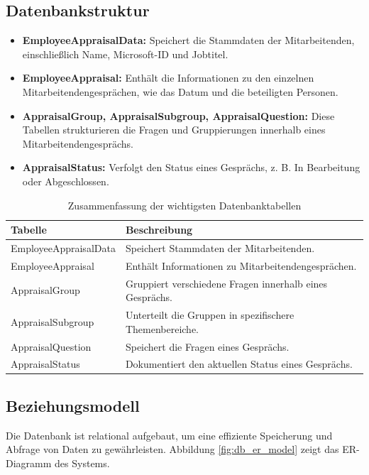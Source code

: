 \subsection{Datenbankstruktur}
\begin{itemize}
    \item \textbf{EmployeeAppraisalData:} Speichert die Stammdaten der Mitarbeitenden, einschlie\ss lich Name, Microsoft-ID und Jobtitel.
    \item \textbf{EmployeeAppraisal:} Enth\"alt die Informationen zu den einzelnen Mitarbeitendengespr\"achen, wie das Datum und die beteiligten Personen.
    \item \textbf{AppraisalGroup, AppraisalSubgroup, AppraisalQuestion:} Diese Tabellen strukturieren die Fragen und Gruppierungen innerhalb eines Mitarbeitendengespr\"achs.
    \item \textbf{AppraisalStatus:} Verfolgt den Status eines Gespr\"achs, z. B. \glqq In Bearbeitung\grqq{} oder \glqq Abgeschlossen\grqq{}.
\end{itemize}

\begin{table}[h!]
\centering
\caption{Zusammenfassung der wichtigsten Datenbanktabellen}
\label{tab:db_overview}
\begin{tabularx}{\textwidth}{|X|X|}
\hline
\textbf{Tabelle} & \textbf{Beschreibung} \\\hline
EmployeeAppraisalData & Speichert Stammdaten der Mitarbeitenden. \\\hline
EmployeeAppraisal & Enth\"alt Informationen zu Mitarbeitendengespr\"achen. \\\hline
AppraisalGroup & Gruppiert verschiedene Fragen innerhalb eines Gespr\"achs. \\\hline
AppraisalSubgroup & Unterteilt die Gruppen in spezifischere Themenbereiche. \\\hline
AppraisalQuestion & Speichert die Fragen eines Gespr\"achs. \\\hline
AppraisalStatus & Dokumentiert den aktuellen Status eines Gespr\"achs. \\\hline
\end{tabularx}
\end{table}

\subsection{Beziehungsmodell}
Die Datenbank ist relational aufgebaut, um eine effiziente Speicherung und Abfrage von Daten zu gew\"ahrleisten. Abbildung \ref{fig:db_er_model} zeigt das ER-Diagramm des Systems.

